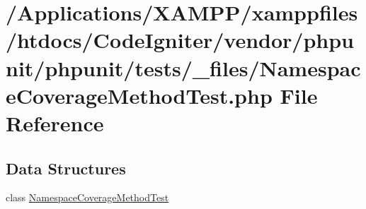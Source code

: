 \hypertarget{phpunit_2tests_2__files_2_namespace_coverage_method_test_8php}{}\section{/\+Applications/\+X\+A\+M\+P\+P/xamppfiles/htdocs/\+Code\+Igniter/vendor/phpunit/phpunit/tests/\+\_\+files/\+Namespace\+Coverage\+Method\+Test.php File Reference}
\label{phpunit_2tests_2__files_2_namespace_coverage_method_test_8php}
\subsection*{Data Structures}
\begin{DoxyCompactItemize}
\item 
class \mbox{\hyperlink{class_namespace_coverage_method_test}{Namespace\+Coverage\+Method\+Test}}
\end{DoxyCompactItemize}
